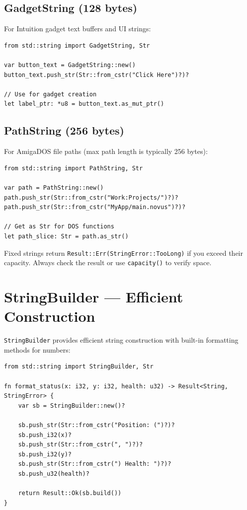 \subsection{GadgetString (128 bytes)}

For Intuition gadget text buffers and UI strings:

\begin{lstlisting}
from std::string import GadgetString, Str

var button_text = GadgetString::new()
button_text.push_str(Str::from_cstr("Click Here")?)?

// Use for gadget creation
let label_ptr: *u8 = button_text.as_mut_ptr()
\end{lstlisting}

\subsection{PathString (256 bytes)}

For AmigaDOS file paths (max path length is typically 256 bytes):

\begin{lstlisting}
from std::string import PathString, Str

var path = PathString::new()
path.push_str(Str::from_cstr("Work:Projects/")?)?
path.push_str(Str::from_cstr("MyApp/main.novus")?)?

// Get as Str for DOS functions
let path_slice: Str = path.as_str()
\end{lstlisting}

\begin{tipbox}
Fixed strings return \texttt{Result::Err(StringError::TooLong)} if you exceed their capacity. Always check the result or use \texttt{capacity()} to verify space.
\end{tipbox}

\section{StringBuilder --- Efficient Construction}
\label{sec:stringbuilder}

\texttt{StringBuilder} provides efficient string construction with built-in formatting methods for numbers:

\begin{lstlisting}
from std::string import StringBuilder, Str

fn format_status(x: i32, y: i32, health: u32) -> Result<String, StringError> {
    var sb = StringBuilder::new()?

    sb.push_str(Str::from_cstr("Position: (")?)?
    sb.push_i32(x)?
    sb.push_str(Str::from_cstr(", ")?)?
    sb.push_i32(y)?
    sb.push_str(Str::from_cstr(") Health: ")?)?
    sb.push_u32(health)?

    return Result::Ok(sb.build())
}
\end{lstlisting}

